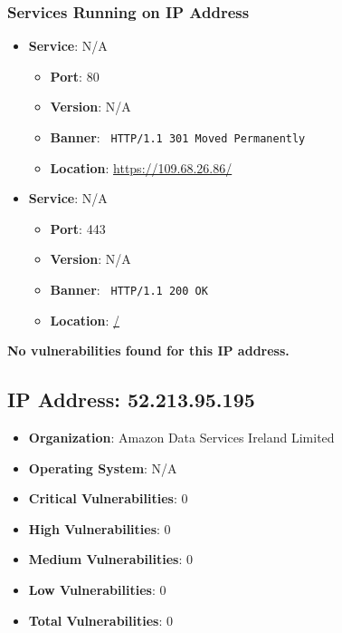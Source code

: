 \documentclass{article}
\begin{document}
\subsubsection*{Services Running on IP Address}

\begin{itemize}
    
        \item \textbf{Service}: N/A
        \begin{itemize}
            \item \textbf{Port}: 80
            \item \textbf{Version}:  N/A 
            \item \textbf{Banner}: \texttt{
                HTTP/1.1 301 Moved Permanently
            }
            \item \textbf{Location}: \href{ https://109.68.26.86/ }{ https://109.68.26.86/ }
        \end{itemize}
    
        \item \textbf{Service}: N/A
        \begin{itemize}
            \item \textbf{Port}: 443
            \item \textbf{Version}:  N/A 
            \item \textbf{Banner}: \texttt{
                HTTP/1.1 200 OK
            }
            \item \textbf{Location}: \href{ / }{ / }
        \end{itemize}
    
\end{itemize}


\textbf{No vulnerabilities found for this IP address.}




\clearpage



\subsection*{IP Address: 52.213.95.195}

\begin{itemize}
    \item \textbf{Organization}: Amazon Data Services Ireland Limited
    \item \textbf{Operating System}:  N/A 
    \item \textbf{Critical Vulnerabilities}: 0
    \item \textbf{High Vulnerabilities}: 0
    \item \textbf{Medium Vulnerabilities}: 0
    \item \textbf{Low Vulnerabilities}: 0
    \item \textbf{Total Vulnerabilities}: 0
\end{itemize}
\end{document}

